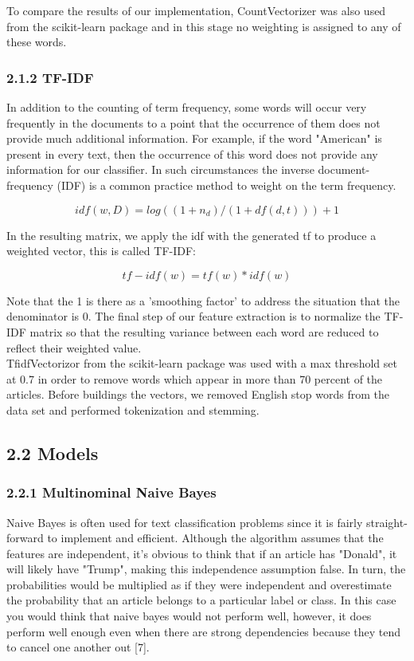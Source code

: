 \documentclass{neu_handout}
\begin{document}
To compare the results of our implementation, CountVectorizer was also used from the scikit-learn package and in this stage no weighting is assigned to any of these words.


\subsubsection*{2.1.2 TF-IDF}
In addition to the counting of term frequency, some words will occur very frequently in the documents to a point that the occurrence of them does not provide much additional information. For example, if the word "American" is present in every text, then the occurrence of this word does not provide any information for our classifier. In such circumstances the inverse document-frequency (IDF) is a common practice method to weight on the term frequency.

$$idf(w,D)=log((1+n_d)/(1+df(d,t)))+1$$

In the resulting matrix, we apply the idf with the generated tf to produce a weighted vector, this is called TF-IDF:

$$tf-idf(w)=tf(w)*idf(w)$$

Note that the 1 is there as a 'smoothing factor' to address the situation that the denominator is 0. The final step of our feature extraction is to normalize the TF-IDF matrix so that the resulting variance between each word are reduced to reflect their weighted value.\\

TfidfVectorizor from the scikit-learn package was used with a max threshold set at 0.7 in order to remove words which appear in more than 70 percent of the articles. Before buildings the vectors, we removed English stop words from the data set and performed tokenization and stemming.

\subsection*{2.2 Models}



\subsubsection*{2.2.1 Multinominal Naive Bayes}

Naive Bayes is often used for text classification problems since it is  fairly straight-forward to implement and efficient. Although the algorithm assumes that the features are independent, it's obvious to think that if an article has "Donald", it will likely have "Trump", making this independence assumption false. In turn, the probabilities would be multiplied as if they were independent and overestimate the probability that an article belongs to a particular label or class. In this case you would think that naive bayes would not perform well, however, it does perform well enough even when there are strong dependencies because they tend to cancel one another out [7].\\
\end{document}
